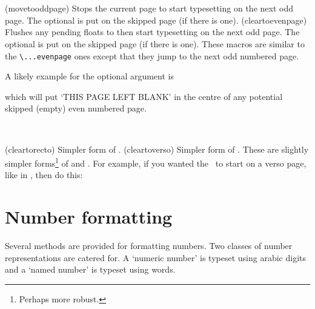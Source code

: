 \begin{syntax}
\cmd{\movetooddpage} \\
\cmd{\cleartooddpage} \\
\end{syntax}
\glossary(movetooddpage)%
  {}%
  {Stops the current page to start typesetting on the next odd page.
   The optional  is put on the skipped page (if there is one).}
\glossary(cleartoevenpage)%
  {}%
  {Flushes any pending floats to then start typesetting on the next odd page.
   The optional  is put on the skipped page (if there is one).}
These macros are similar to the \verb?\...evenpage? ones except that they jump
to the next odd numbered page.

    A likely example for the optional  argument is
\begin{lcode}
\end{lcode}
which will put `THIS PAGE LEFT BLANK' in the centre of any
potential skipped (empty) even numbered page.

\begin{syntax}
\cmd{\cleartorecto} \cmd{\cleartoverso} \\
\end{syntax}
\glossary(cleartorecto)%
  {}%
  {Simpler form of .}
\glossary(cleartoverso)%
  {}%
  {Simpler form of .}
These are slightly simpler forms\footnote{Perhaps more robust.} of
\cmd{\cleartooddpage} and \cmd{\cleartoevenpage}. For example, if you wanted
the \toc\ to start on a verso page, like in 
 \cite{TEXBOOK}, then do this:
\begin{lcode}
\cleartoverso
\tableofcontents
\end{lcode}

\section{Number formatting}

    Several methods are provided for formatting numbers. 
Two classes of number representations 
are catered for. 
A `numeric number' is typeset using arabic 
digits and a `named number' is typeset using
words.

